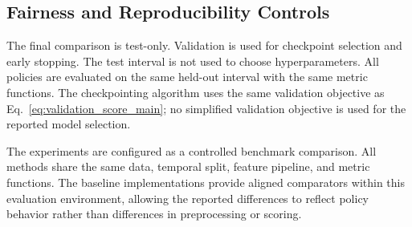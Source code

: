 

\subsection{Fairness and Reproducibility Controls}

The final comparison is test-only. Validation is used for checkpoint selection and early stopping. The test interval is not used to choose hyperparameters. All policies are evaluated on the same held-out interval with the same metric functions. The checkpointing algorithm uses the same validation objective as Eq.~\eqref{eq:validation_score_main}; no simplified validation objective is used for the reported model selection.

The experiments are configured as a controlled benchmark comparison. All methods share the same data, temporal split, feature pipeline, and metric functions. The baseline implementations provide aligned comparators within this evaluation environment, allowing the reported differences to reflect policy behavior rather than differences in preprocessing or scoring.
